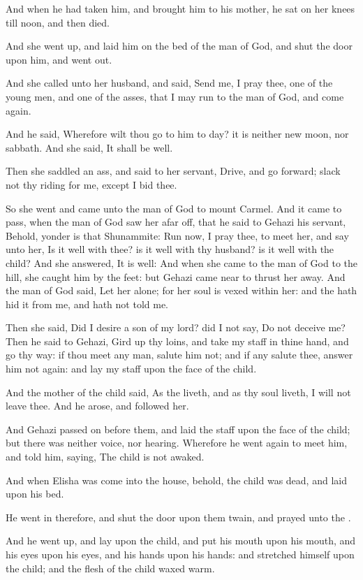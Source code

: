 \Verse And when he had taken him, and brought him to his mother, he sat on her knees till noon, and then died.

\Verse And she went up, and laid him on the bed of the man of God, and shut the door upon him, and went out.

\Verse And she called unto her husband, and said, Send me, I pray thee, one of the young men, and one of the asses, that I may run to the man of God, and come again.

\Verse And he said, Wherefore wilt thou go to him to day? it is neither new moon, nor sabbath. And she said, It shall be well.

\Verse Then she saddled an ass, and said to her servant, Drive, and go forward; slack not thy riding for me, except I bid thee.

\Verse So she went and came unto the man of God to mount Carmel. And it came to pass, when the man of God saw her afar off, that he said to Gehazi his servant, Behold, yonder is that Shunammite: \Verse Run now, I pray thee, to meet her, and say unto her, Is it well with thee? is it well with thy husband? is it well with the child? And she answered, It is well: \Verse And when she came to the man of God to the hill, she caught him by the feet: but Gehazi came near to thrust her away. And the man of God said, Let her alone; for her soul is vexed within her: and the \LORD hath hid it from me, and hath not told me.

\Verse Then she said, Did I desire a son of my lord? did I not say, Do not deceive me?  \Verse Then he said to Gehazi, Gird up thy loins, and take my staff in thine hand, and go thy way: if thou meet any man, salute him not; and if any salute thee, answer him not again: and lay my staff upon the face of the child.

\Verse And the mother of the child said, As the \LORD liveth, and as thy soul liveth, I will not leave thee. And he arose, and followed her.

\Verse And Gehazi passed on before them, and laid the staff upon the face of the child; but there was neither voice, nor hearing. Wherefore he went again to meet him, and told him, saying, The child is not awaked.

\Verse And when Elisha was come into the house, behold, the child was dead, and laid upon his bed.

\Verse He went in therefore, and shut the door upon them twain, and prayed unto the \LORD.

\Verse And he went up, and lay upon the child, and put his mouth upon his mouth, and his eyes upon his eyes, and his hands upon his hands: and stretched himself upon the child; and the flesh of the child waxed warm.

